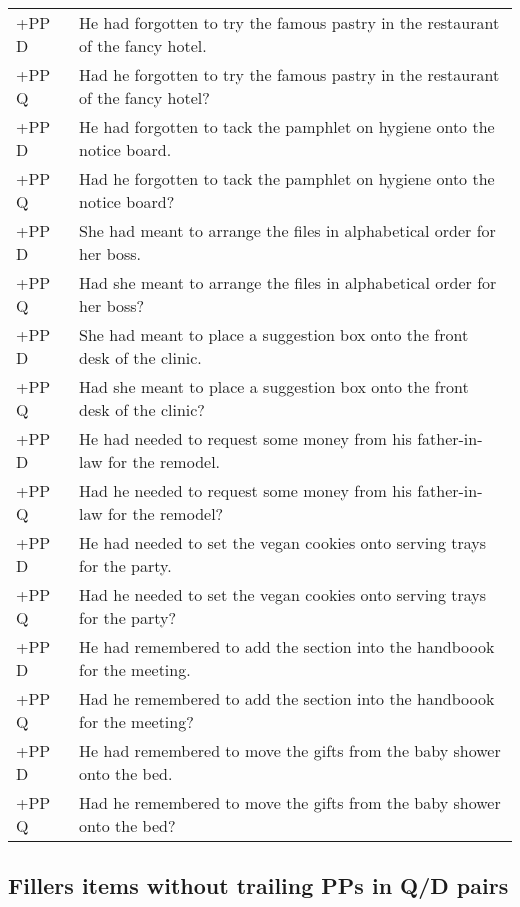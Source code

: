 \documentclass[11pt,oneside]{book}
\begin{document}
\begin{longtable}{ll}
+PP D & He had forgotten to try the famous pastry in the restaurant of the fancy hotel.\\
+PP Q & Had he forgotten to try the famous pastry in the restaurant of the fancy hotel?\\
\addlinespace
+PP D & He had forgotten to tack the pamphlet on hygiene onto the notice board.\\
+PP Q & Had he forgotten to tack the pamphlet on hygiene onto the notice board?\\
\addlinespace
+PP D & She had meant to arrange the files in alphabetical order for her boss.\\
+PP Q & Had she meant to arrange the files in alphabetical order for her boss?\\
\addlinespace
+PP D & She had meant to place a suggestion box onto the front desk of the clinic.\\
+PP Q & Had she meant to place a suggestion box onto the front desk of the clinic?\\
\addlinespace
+PP D & He had needed to request some money from his father-in-law for the remodel.\\
+PP Q & Had he needed to request some money from his father-in-law for the remodel?\\
\addlinespace
+PP D & He had needed to set the vegan cookies onto serving trays for the party.\\
+PP Q & Had he needed to set the vegan cookies onto serving trays for the party?\\
\addlinespace
+PP D & He had remembered to add the section into the handboook for the meeting.\\
+PP Q & Had he remembered to add the section into the handboook for the meeting?\\
\addlinespace
+PP D & He had remembered to move the gifts from the baby shower onto the bed.\\
+PP Q & Had he remembered to move the gifts from the baby shower onto the bed?\\*
\end{longtable}

\newpage

\hypertarget{fillers-items-without-trailing-pps-in-qd-pairs}{%
\subsection*{Fillers items without trailing PPs in Q/D pairs}\label{fillers-items-without-trailing-pps-in-qd-pairs}}
\end{document}
